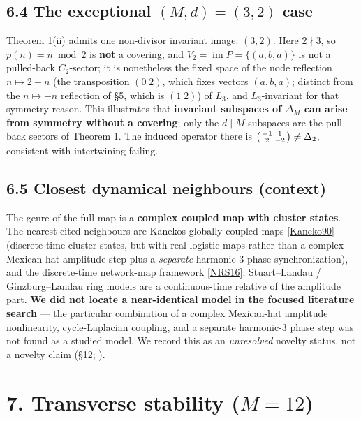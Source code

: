 \documentclass[
  11pt,
  a4paper,
]{article}
\newcounter{none} %
\begin{document}
\subsection{\texorpdfstring{6.4 The exceptional \((M,d)=(3,2)\) case}{6.4 The exceptional (M,d)=(3,2) case}}\label{the-exceptional-md32-case}

Theorem 1(ii) admits one non-divisor invariant image: \((3,2)\). Here \(2\nmid3\), so \(p(n)=n\bmod2\) is \textbf{not} a covering, and \(V_2=\operatorname{im}P=\{(a,b,a)\}\) is not a pulled-back \(C_2\)-sector; it is nonetheless the fixed space of the node reflection \(n\mapsto2-n\) (the transposition \((0\;2)\), which fixes vectors \((a,b,a)\); distinct from the \(n\mapsto-n\) reflection of §5, which is \((1\;2)\)) of \(L_3\), and \(L_3\)-invariant for that symmetry reason. This illustrates that \textbf{invariant subspaces of \(\Delta_M\) can arise from symmetry without a covering}; only the \(d\mid M\) subspaces are the pull-back sectors of Theorem 1. The induced operator there is \(\begin{psmallmatrix}-1&1\\2&-2\end{psmallmatrix}\neq\Delta_2\), consistent with intertwining failing.

\subsection{6.5 Closest dynamical neighbours (context)}\label{closest-dynamical-neighbours-context}

The genre of the full map is a \textbf{complex coupled map with cluster states}. The nearest cited neighbours are Kaneko\textquotesingle s globally coupled maps {[}\hyperlink{ref-Kaneko90}{Kaneko90}{]} (discrete-time cluster states, but with real logistic maps rather than a complex Mexican-hat amplitude step plus a \emph{separate} harmonic-3 phase synchronization), and the discrete-time network-map framework {[}\hyperlink{ref-NRS16}{NRS16}{]}; Stuart--Landau / Ginzburg--Landau ring models are a continuous-time relative of the amplitude part. \textbf{We did not locate a near-identical model in the focused literature search} --- the particular combination of a complex Mexican-hat amplitude nonlinearity, cycle-Laplacian coupling, and a separate harmonic-3 phase step was not found as a studied model. We record this as an \emph{unresolved} novelty status, not a novelty claim (§12; ).

\section{\texorpdfstring{7. Transverse stability (\(M=12\))}{7. Transverse stability (M=12)}}\label{transverse-stability-m12}
\end{document}
